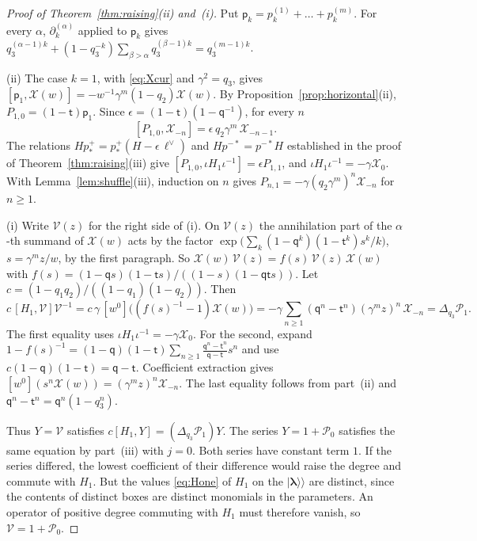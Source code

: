 \documentclass[11pt]{amsart}
\theoremstyle{definition}
\theoremstyle{remark}
\newcommand{\Mq}{\mathsf q}                      %
\newcommand{\Mt}{\mathsf t}                      %
\newcommand{\bl}{{\boldsymbol{\lambda}}}         %
\newcommand{\Cartan}[1]{H_{#1}}                  %
\newcommand{\kket}[1]{\lvert #1\rangle\!\rangle} %
\newcommand{\taut}{\ell}                         %
\newcommand{\dtaut}{\taut^{\vee}}                %
\newcommand{\pulm}{p^{-*}}                       %
\newcommand{\pushp}{p^+_*}                       %
\newcommand{\pk}[2]{p_{#1}^{(#2)}}               %
\newcommand{\Hiso}{\iota}                        %
\newcommand{\Pser}[1]{\mathcal P_{#1}}           %
\newcommand{\Dq}{\Delta_{q_3}}                   %
\newcommand{\Xcur}{\mathcal X}                   %
\begin{document}
\begin{proof}[Proof of Theorem~\ref{thm:raising}(ii) and~(i)]
Put \(\mathsf p_k=\pk{k}{1}+\dots+\pk{k}{m}\). For every \(\alpha\),
\(\partial^{(\alpha)}_k\) applied to \(\mathsf p_k\) gives
\(q_3^{(\alpha-1)k}+(1-q_3^{-k})\sum_{\beta>\alpha}q_3^{(\beta-1)k}=q_3^{(m-1)k}\).

(ii) The case \(k=1\), with \eqref{eq:Xcur} and \(\gamma^2=q_3\), gives
\([\mathsf p_1,\Xcur(w)]=-w^{-1}\gamma^m(1-q_2)\Xcur(w)\). By
Proposition~\ref{prop:horizontal}(ii), \(P_{1,0}=(1-\Mt)\mathsf p_1\). Since
\(\epsilon=(1-\Mt)(1-\Mq^{-1})\), for every \(n\)
\[
 [P_{1,0},\Xcur_{-n}]=\epsilon\,q_2\gamma^m\,\Xcur_{-n-1}.
\]
The relations \(H\pushp=\pushp(H-\epsilon\,\dtaut)\) and \(H\pulm=\pulm H\) established in the proof of
Theorem~\ref{thm:raising}(iii) give \([P_{1,0},\Hiso\Cartan{1}\Hiso^{-1}]=\epsilon P_{1,1}\), and
\(\Hiso\Cartan{1}\Hiso^{-1}=-\gamma\Xcur_0\). With Lemma~\ref{lem:shuffle}(iii), induction on \(n\)
gives \(P_{n,1}=-\gamma(q_2\gamma^m)^n\Xcur_{-n}\) for \(n\geq1\).

(i) Write \(\mathcal V(z)\) for the right side of (i). On \(\mathcal V(z)\) the
annihilation part of the \(\alpha\)-th summand of \(\Xcur(w)\) acts by the factor
\(\exp\bigl(\sum_k(1-\Mq^k)(1-\Mt^k)s^k/k\bigr)\), \(s=\gamma^mz/w\), by the first paragraph. So
\(\Xcur(w)\,\mathcal V(z)=f(s)\,\mathcal V(z)\,\Xcur(w)\) with
\(f(s)=(1-\Mq s)(1-\Mt s)/((1-s)(1-\Mq\Mt s))\). Let
\(c=(1-q_1q_2)/((1-q_1)(1-q_2))\). Then
\[
 c\,[\Cartan{1},\mathcal V]\mathcal V^{-1}
 =c\,\gamma\,[w^0]\bigl((f(s)^{-1}-1)\Xcur(w)\bigr)
 =-\gamma\sum_{n\geq1}(\Mq^n-\Mt^n)(\gamma^mz)^n\,\Xcur_{-n}=\Dq\Pser{1}.
\]
The first equality uses \(\Hiso\Cartan{1}\Hiso^{-1}=-\gamma\Xcur_0\).
For the second, expand
\(1-f(s)^{-1}=(1-\Mq)(1-\Mt)\sum_{n\geq1}\frac{\Mq^n-\Mt^n}{\Mq-\Mt}s^n\)
and use \(c(1-\Mq)(1-\Mt)=\Mq-\Mt\).
Coefficient extraction gives \([w^0](s^n\Xcur(w))=(\gamma^mz)^n\Xcur_{-n}\).
The last equality follows from part~(ii) and \(\Mq^n-\Mt^n=\Mq^n(1-q_3^n)\).

Thus \(Y=\mathcal V\) satisfies \(c[\Cartan{1},Y]=(\Dq\Pser{1})Y\).
The series \(Y=1+\Pser{0}\) satisfies the same equation by
part~(iii) with \(j=0\). Both series have constant term \(1\). If the series differed, the
lowest coefficient of their difference would raise the degree and commute with \(\Cartan{1}\). But the
values \eqref{eq:Hone} of \(\Cartan{1}\) on the \(\kket{\bl}\) are distinct, since the contents of
distinct boxes are distinct monomials in the parameters.
An operator of positive degree commuting with \(\Cartan{1}\) must therefore
vanish, so \(\mathcal V=1+\Pser{0}\).
\end{proof}
\end{document}
